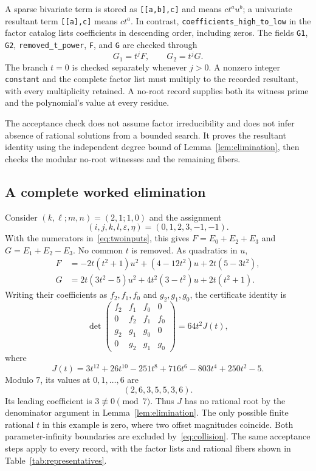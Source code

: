 A sparse bivariate term is stored as \texttt{[[a,b],c]} and means $ct^au^b$; a univariate resultant term \texttt{[[a],c]} means $ct^a$. In contrast, \texttt{coefficients\_high\_to\_low} in the factor catalog lists coefficients in descending order, including zeros. The fields \texttt{G1}, \texttt{G2}, \texttt{removed\_t\_power}, \texttt{F}, and \texttt{G} are checked through
\[
 G_1=t^jF,\qquad G_2=t^jG.
\]
The branch $t=0$ is checked separately whenever $j>0$. A nonzero integer \texttt{constant} and the complete factor list must multiply to the recorded resultant, with every multiplicity retained. A no-root record supplies both its witness prime and the polynomial's value at every residue.

The acceptance check does not assume factor irreducibility and does not infer absence of rational solutions from a bounded search. It proves the resultant identity using the independent degree bound of Lemma~\ref{lem:elimination}, then checks the modular no-root witnesses and the remaining fibers.

\subsection{A complete worked elimination}
Consider $(k,\ell;m,n)=(2,1;1,0)$ and the assignment
\[
 (i,j,k,l,\varepsilon,\eta)=(0,1,2,3,-1,-1).
\]
With the numerators in~\eqref{eq:twoinputs}, this gives $F=E_0+E_2+E_3$ and $G=E_1+E_2-E_3$. No common $t$ is removed. As quadratics in $u$,
\begin{align*}
 F&=-2t(t^2+1)u^2+(4-12t^2)u+2t(5-3t^2),\\
 G&=2t(3t^2-5)u^2+4t^2(3-t^2)u+2t(t^2+1).
\end{align*}
Writing their coefficients as $f_2,f_1,f_0$ and $g_2,g_1,g_0$, the certificate identity is
\begin{equation}\label{eq:workedresultant}
 \det\begin{pmatrix}
 f_2&f_1&f_0&0\\0&f_2&f_1&f_0\\
 g_2&g_1&g_0&0\\0&g_2&g_1&g_0
 \end{pmatrix}=64t^2J(t),
\end{equation}
where
\[
 J(t)=3t^{12}+26t^{10}-251t^8+716t^6-803t^4+250t^2-5.
\]
Modulo $7$, its values at $0,1,\ldots,6$ are
\[
 (2,6,3,5,5,3,6).
\]
Its leading coefficient is $3\not\equiv0\pmod7$. Thus $J$ has no rational root by the denominator argument in Lemma~\ref{lem:elimination}. The only possible finite rational $t$ in this example is zero, where two offset magnitudes coincide. Both parameter-infinity boundaries are excluded by~\eqref{eq:collision}. The same acceptance steps apply to every record, with the factor lists and rational fibers shown in Table~\ref{tab:representatives}.

